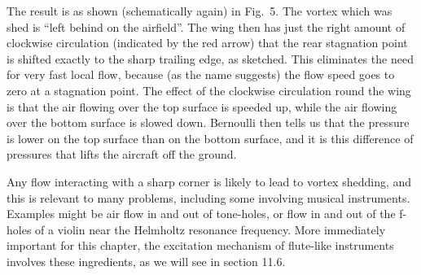   The result is as shown (schematically again) in Fig.\ 5. The vortex which was 
  shed is ``left behind on the airfield''. The wing then has just the right 
  amount of clockwise circulation (indicated by the red arrow) that the rear 
  stagnation point is shifted exactly to the sharp trailing edge, as sketched. 
  This eliminates the need for very fast local flow, because (as the name 
  suggests) the flow speed goes to zero at a stagnation point. The effect of 
  the clockwise circulation round the wing is that the air flowing over the top 
  surface is speeded up, while the air flowing over the bottom surface is 
  slowed down. Bernoulli then tells us that the pressure is lower on the top 
  surface than on the bottom surface, and it is this difference of pressures 
  that lifts the aircraft off the ground. 

  Any flow interacting with a sharp corner is likely to lead to vortex 
  shedding, and this is relevant to many problems, including some involving 
  musical instruments. Examples might be air flow in and out of tone-holes, or 
  flow in and out of the f-holes of a violin near the Helmholtz resonance 
  frequency. More immediately important for this chapter, the excitation 
  mechanism of flute-like instruments involves these ingredients, as we will 
  see in section 11.6. 